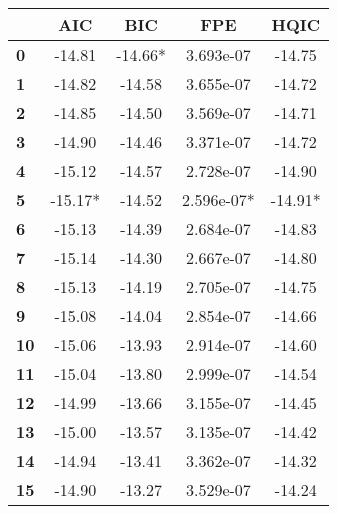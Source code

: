 \begin{center}
\begin{tabular}{lcccc}
\toprule
            & \textbf{AIC} & \textbf{BIC} & \textbf{FPE} & \textbf{HQIC}  \\
\midrule
\textbf{0}  &      -14.81  &     -14.66*  &   3.693e-07  &       -14.75   \\
\textbf{1}  &      -14.82  &      -14.58  &   3.655e-07  &       -14.72   \\
\textbf{2}  &      -14.85  &      -14.50  &   3.569e-07  &       -14.71   \\
\textbf{3}  &      -14.90  &      -14.46  &   3.371e-07  &       -14.72   \\
\textbf{4}  &      -15.12  &      -14.57  &   2.728e-07  &       -14.90   \\
\textbf{5}  &     -15.17*  &      -14.52  &  2.596e-07*  &      -14.91*   \\
\textbf{6}  &      -15.13  &      -14.39  &   2.684e-07  &       -14.83   \\
\textbf{7}  &      -15.14  &      -14.30  &   2.667e-07  &       -14.80   \\
\textbf{8}  &      -15.13  &      -14.19  &   2.705e-07  &       -14.75   \\
\textbf{9}  &      -15.08  &      -14.04  &   2.854e-07  &       -14.66   \\
\textbf{10} &      -15.06  &      -13.93  &   2.914e-07  &       -14.60   \\
\textbf{11} &      -15.04  &      -13.80  &   2.999e-07  &       -14.54   \\
\textbf{12} &      -14.99  &      -13.66  &   3.155e-07  &       -14.45   \\
\textbf{13} &      -15.00  &      -13.57  &   3.135e-07  &       -14.42   \\
\textbf{14} &      -14.94  &      -13.41  &   3.362e-07  &       -14.32   \\
\textbf{15} &      -14.90  &      -13.27  &   3.529e-07  &       -14.24   \\
\bottomrule
\end{tabular}
\end{center}